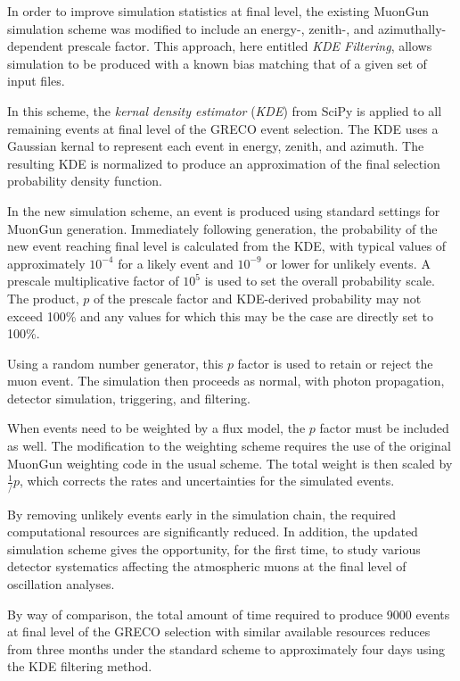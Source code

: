 In order to improve simulation statistics at final level, the existing MuonGun simulation scheme was modified to include an energy-, zenith-, and azimuthally-dependent prescale factor.
This approach, here entitled \emph{KDE Filtering}, allows simulation to be produced with a known bias matching that of a given set of input files.

In this scheme, the \emph{kernal density estimator} (\emph{KDE}) from SciPy \cite{scipy} is applied to all remaining events at final level of the GRECO event selection. 
The KDE uses a Gaussian kernal to represent each event in energy, zenith, and azimuth. 
The resulting KDE is normalized to produce an approximation of the final selection probability density function.

In the new simulation scheme, an event is produced using standard settings for MuonGun generation. 
Immediately following generation, the probability of the new event reaching final level is calculated from the KDE, with typical values 
of approximately $10^{-4}$ for a likely event and $10^{-9}$ or lower for unlikely events.
A prescale multiplicative factor of $10^5$ is used to set the overall probability scale.
The product, $p$ of the prescale factor and KDE-derived probability may not exceed 100\% and any values for which this may be the case are directly set to 100\%.

Using a random number generator, this $p$ factor is used to retain or reject the muon event.
The simulation then proceeds as normal, with photon propagation, detector simulation, triggering, and filtering.

When events need to be weighted by a flux model, the $p$ factor must be included as well. 
The modification to the weighting scheme requires the use of the original MuonGun weighting code in the usual scheme. 
The total weight is then scaled by $\frac{1}/{p}$, which corrects the rates and uncertainties for the simulated events.

By removing unlikely events early in the simulation chain, the required computational resources are significantly reduced.
In addition, the updated simulation scheme gives the opportunity, for the first time, to study various detector systematics affecting the atmospheric muons at the final level of oscillation analyses.

By way of comparison, the total amount of time required to produce 9000 events at final level of the GRECO selection with similar available resources reduces from three months under the standard scheme to approximately four days using the KDE filtering method.

